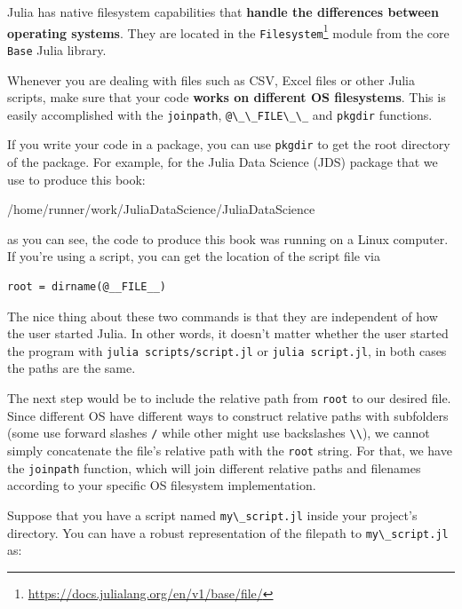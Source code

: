 \documentclass[
  notoc %
]{tufte-book}
\DeclareRobustCommand{\href}[2]{#2\footnote{\url{#1}}}
\newcommand{\passthrough}[1]{#1}
\begin{document}
Julia has native filesystem capabilities that \textbf{handle the
differences between operating systems}. They are located in the
\href{https://docs.julialang.org/en/v1/base/file/}{\passthrough{\lstinline!Filesystem!}}
module from the core \passthrough{\lstinline!Base!} Julia library.

Whenever you are dealing with files such as CSV, Excel files or other
Julia scripts, make sure that your code \textbf{works on different OS
filesystems}. This is easily accomplished with the
\passthrough{\lstinline!joinpath!},
\passthrough{\lstinline!@\_\_FILE\_\_!} and
\passthrough{\lstinline!pkgdir!} functions.

If you write your code in a package, you can use
\passthrough{\lstinline!pkgdir!} to get the root directory of the
package. For example, for the Julia Data Science (JDS) package that we
use to produce this book:

/home/runner/work/JuliaDataScience/JuliaDataScience

as you can see, the code to produce this book was running on a Linux
computer. If you're using a script, you can get the location of the
script file via

\begin{lstlisting}
root = dirname(@__FILE__)
\end{lstlisting}

The nice thing about these two commands is that they are independent of
how the user started Julia. In other words, it doesn't matter whether
the user started the program with
\passthrough{\lstinline!julia scripts/script.jl!} or
\passthrough{\lstinline!julia script.jl!}, in both cases the paths are
the same.

The next step would be to include the relative path from
\passthrough{\lstinline!root!} to our desired file. Since different OS
have different ways to construct relative paths with subfolders (some
use forward slashes \passthrough{\lstinline!/!} while other might use
backslashes \passthrough{\lstinline!\\!}), we cannot simply concatenate
the file's relative path with the \passthrough{\lstinline!root!} string.
For that, we have the \passthrough{\lstinline!joinpath!} function, which
will join different relative paths and filenames according to your
specific OS filesystem implementation.

Suppose that you have a script named
\passthrough{\lstinline!my\_script.jl!} inside your project's directory.
You can have a robust representation of the filepath to
\passthrough{\lstinline!my\_script.jl!} as:
\end{document}
